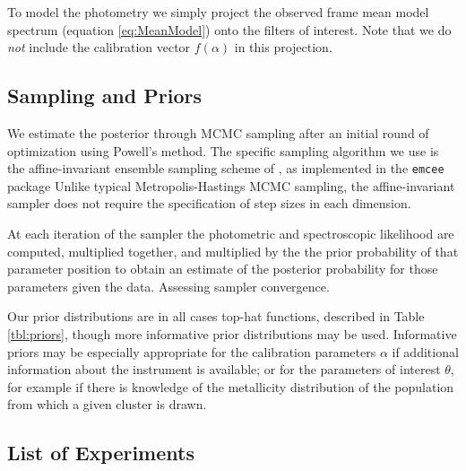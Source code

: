 \documentclass[iop,numberedappendix]{emulateapj}
\begin{document}
To model the photometry we simply project the observed frame mean
model spectrum (equation \ref{eq:MeanModel}) onto the filters of
interest.  Note that we do \emph{not} include the calibration vector
$f(\alpha)$ in this projection.


\subsection{Sampling and Priors}

We estimate the posterior through MCMC sampling after an initial round
of optimization using Powell's method.  The specific sampling
algorithm we use is the affine-invariant ensemble sampling scheme of
\citet{goodman}, as implemented in the \texttt{emcee} package
\citep{emcee} Unlike typical Metropolis-Hastings MCMC sampling, the
affine-invariant sampler does not require the specification of step
sizes in each dimension.
 
At each iteration of the sampler the photometric and spectroscopic
likelihood are computed, multiplied together, and multiplied by the
the prior probability of that parameter position to obtain an estimate
of the posterior probability for those parameters given the
data. {\color{blue}Assessing sampler convergence.}

Our prior distributions are in all cases top-hat functions, described
in Table \ref{tbl:priors}, though more informative prior distributions
may be used.  Informative priors may be especially appropriate for the
calibration parameters $\alpha$ if additional information about the
instrument is available; or for the parameters of interest $\theta$,
for example if there is knowledge of the metallicity
distribution of the population from which a given cluster is drawn.



\subsection{List of Experiments}
\end{document}
